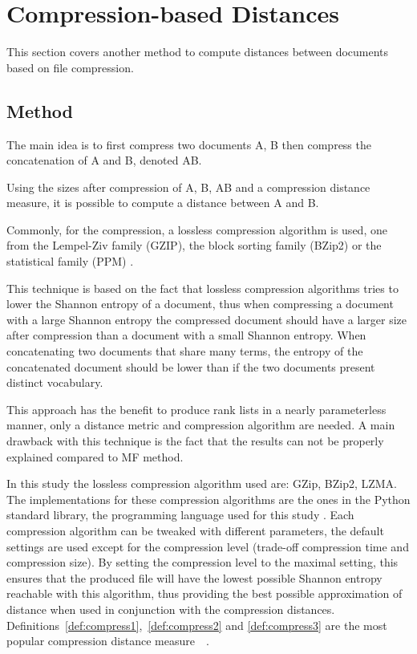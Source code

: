 \section{Compression-based Distances \label{sec:compression_based_distances}}

This section covers another method to compute distances between documents based on file compression.

\subsection{Method}

The main idea is to first compress two documents A, B then compress the concatenation of A and B, denoted AB.

Using the sizes after compression of A, B, AB and a compression distance measure, it is possible to compute a distance between A and B.

Commonly, for the compression, a lossless compression algorithm is used, one from the Lempel-Ziv family (GZIP), the block sorting family (BZip2) or the statistical family (PPM) \cite{comparing_compression}.

This technique is based on the fact that lossless compression algorithms tries to lower the Shannon entropy of a document, thus when compressing a document with a large Shannon entropy the compressed document should have a larger size after compression than a document with a small Shannon entropy.
When concatenating two documents that share many terms, the entropy of the concatenated document should be lower than if the two documents present distinct vocabulary.

This approach has the benefit to produce rank lists in a nearly parameterless manner, only a distance metric and compression algorithm are needed.
A main drawback with this technique is the fact that the results can not be properly explained compared to MF method.

In this study the lossless compression algorithm used are: GZip, BZip2, LZMA.
The implementations for these compression algorithms are the ones in the Python standard library, the programming language used for this study \cite{python_standard_library}.
Each compression algorithm can be tweaked with different parameters, the default settings are used except for the compression level (trade-off compression time and compression size).
By setting the compression level to the maximal setting, this ensures that the produced file will have the lowest possible Shannon entropy reachable with this algorithm, thus providing the best possible approximation of distance when used in conjunction with the compression distances.
Definitions~\ref{def:compress1},~\ref{def:compress2} and \ref{def:compress3} are the most popular compression distance measure~\cite{comparing_compression}~\cite{savoy_stylo}.

